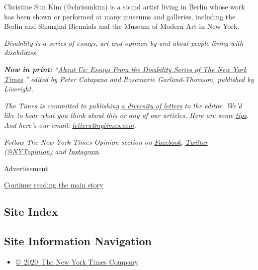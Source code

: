 Christine Sun Kim (@chrisunkim) is a sound artist living in Berlin whose
work has been shown or performed at many museums and galleries,
including the Berlin and Shanghai Biennials and the Museum of Modern Art
in New York.

\emph{Disability is a series of essays, art and opinion by and about
people living with disabilities.}

\emph{\textbf{Now in print:}}
\emph{``}\href{https://www.aboutusbook.com/}{\emph{About Us: Essays From
the Disability Series of The New York Times}}\emph{,'' edited by Peter
Catapano and Rosemarie Garland-Thomson, published by Liveright.}

\emph{The Times is committed to publishing}
\href{https://www.nytimes.com/2019/01/31/opinion/letters/letters-to-editor-new-york-times-women.html}{\emph{a
diversity of letters}} \emph{to the editor. We'd like to hear what you
think about this or any of our articles. Here are some}
\href{https://help.nytimes.com/hc/en-us/articles/115014925288-How-to-submit-a-letter-to-the-editor}{\emph{tips}}\emph{.
And here's our email:}
\href{mailto:letters@nytimes.com}{\emph{letters@nytimes.com}}\emph{.}

\emph{Follow The New York Times Opinion section on}
\href{https://www.facebook.com/nytopinion}{\emph{Facebook}}\emph{,}
\href{http://twitter.com/NYTOpinion}{\emph{Twitter (@NYTopinion)}}
\emph{and}
\href{https://www.instagram.com/nytopinion/}{\emph{Instagram}}\emph{.}

Advertisement

\protect\hyperlink{after-bottom}{Continue reading the main story}

\hypertarget{site-index}{%
\subsection{Site Index}\label{site-index}}

\hypertarget{site-information-navigation}{%
\subsection{Site Information
Navigation}\label{site-information-navigation}}

\begin{itemize}
\tightlist
\item
  \href{https://help.nytimes.com/hc/en-us/articles/115014792127-Copyright-notice}{©~2020~The
  New York Times Company}
\end{itemize}

